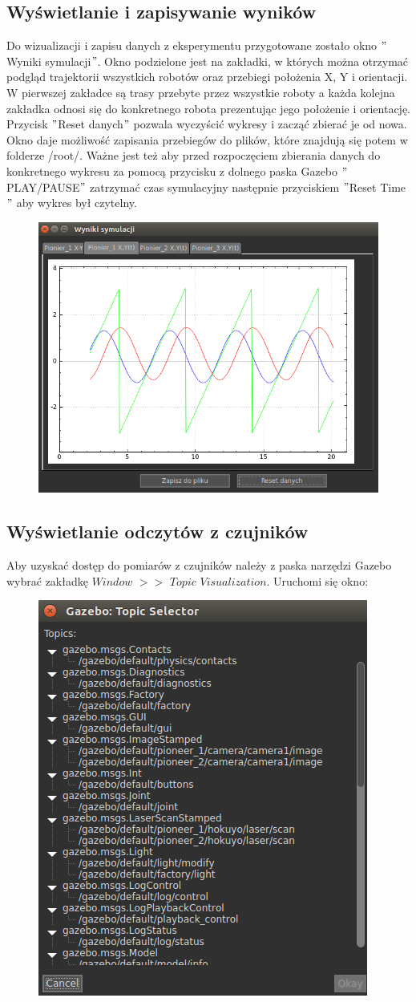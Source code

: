 \documentclass[10pt, a4paper]{article}
\begin{document}
\subsection{Wyświetlanie i zapisywanie wyników}
Do wizualizacji i zapisu danych z eksperymentu przygotowane zostało okno $"$Wyniki symulacji$"$. Okno podzielone jest na zakładki, w których można otrzymać podgląd trajektorii wszystkich robotów oraz przebiegi położenia X, Y i orientacji. W pierwszej zakładce są trasy przebyte przez wszystkie roboty a każda kolejna zakładka odnosi się do konkretnego robota prezentując jego położenie i orientację. Przycisk $"$Reset danych$"$ pozwala wyczyścić wykresy i zacząć zbierać je od nowa.  Okno daje możliwość zapisania przebiegów do plików, które znajdują się potem w folderze /root/.  Ważne jest też aby przed rozpoczęciem zbierania danych do konkretnego wykresu za pomocą przycisku z dolnego paska Gazebo $"$PLAY/PAUSE$"$ zatrzymać czas symulacyjny następnie przyciskiem $"$Reset Time$"$ aby wykres był czytelny.
\begin{figure}[hbt]
  \setlength{\unitlength}{1.0cm}
  \centering 
  
    \includegraphics[width=6 cm]{./grafika/Wykres.png}

\end{figure}

\subsection{Wyświetlanie odczytów z czujników}
Aby uzyskać dostęp do pomiarów z czujników należy z paska narzędzi Gazebo wybrać zakładkę $Window$ $>>$ $Topic$ $Visualization$. Uruchomi się okno:
 \begin{figure}[hbt]
  \setlength{\unitlength}{1.0cm}
  \centering 
  
    \includegraphics[width=6 cm]{./grafika/WizualizacjaLista.png}

\end{figure}
\end{document}

